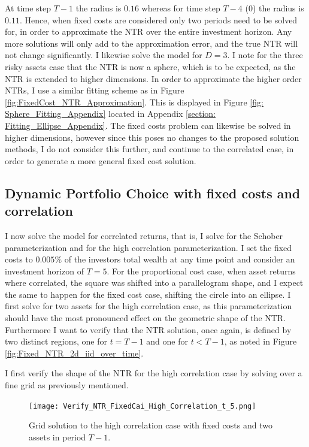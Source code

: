 \documentclass[11pt]{article}
\begin{document}
At time step $T-1$ the radius is $0.16$ whereas for time step $T-4$ ($0$) the radius is $0.11$.
Hence, when fixed costs are considered only two periods need to be solved for, in order to approximate the NTR over the entire investment horizon.
Any more solutions will only add to the approximation error, and the true NTR will not change significantly.
I likewise solve the model for $D=3$.
I note for the three risky assets case that the NTR is now a sphere, which is to be expected, as the NTR is extended to higher dimensions.
In order to approximate the higher order \ac{NTR}s, I use a similar fitting scheme as in Figure \ref{fig:FixedCost_NTR_Approximation}.
This is displayed in Figure \ref{fig: Sphere_Fitting_Appendix} located in Appendix \ref{section: Fitting_Ellipse_Appendix}.
The fixed costs problem can likewise be solved in higher dimensions, however since this poses no changes to the proposed solution methods,
I do not consider this further, and continue to the correlated case, in order to generate a more general fixed cost solution.

\subsection{Dynamic Portfolio Choice with fixed costs and correlation}
I now solve the model for correlated returns, that is, I solve for the Schober parameterization and for the high correlation parameterization.
I set the fixed costs to $0.005\%$ of the investors total wealth at any time point and consider an investment horizon of $T = 5$.
For the proportional cost case, when asset returns where correlated, the square was shifted into a parallelogram shape, and I expect the same to happen for the fixed cost case,
shifting the circle into an ellipse. I first solve for two assets for the high correlation case, as this parameterization 
should have the most pronounced effect on the geometric shape of the \ac{NTR}. Furthermore I want to verify that the \ac{NTR} solution,
once again, is defined by two distinct regions, one for $t = T-1$ and one for $t < T-1$, as noted in Figure \ref{fig:Fixed_NTR_2d_iid_over_time}.

I first verify the shape of the NTR for the high correlation case by solving over a fine grid as previously mentioned.

\begin{figure}[!ht]
    \centering
    \texttt{[image: Verify\_NTR\_FixedCai\_High\_Correlation\_t\_5.png]}
    \caption{Grid solution to the high correlation case with fixed costs and two assets in period $T-1$.}
    \label{fig:NTR_Verify_High_Correlation}
\end{figure}
\end{document}
